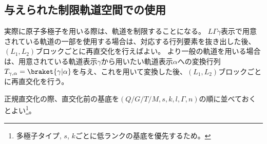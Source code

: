\documentclass[11pt]{easymemo}
\begin{document}
\subsection{与えられた制限軌道空間での使用}

実際に原子多極子を用いる際は、軌道を制限することになる。
$L\Gamma\gamma$表示で用意されている軌道の一部を使用する場合は、対応する行列要素を抜き出した後、$(L_{1},L_{2})$ブロックごとに再直交化を行えばよい。
より一般の軌道を用いる場合は、用意されている軌道表示$\gamma$から用いたい軌道表示$\alpha$への変換行列$T_{\gamma,\alpha}=\braket{\gamma|\alpha}$を与え、これを用いて変換した後、$(L_{1},L_{2})$ブロックごとに再直交化を行う。

正規直交化の際、直交化前の基底を$(Q/G/T/M,s,k,l,\Gamma,n)$の順に並べておくとよい\footnote{多極子タイプ, $s$, $k$ごとに低ランクの基底を優先するため。}。
\end{document}

